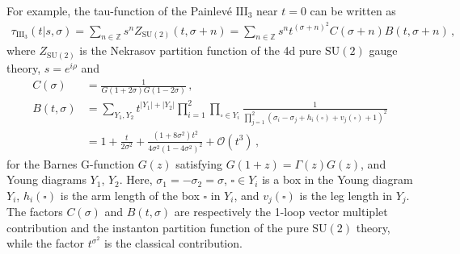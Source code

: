\documentclass[11pt, a4paper]{article}
\theoremstyle{definition}
\begin{document}
For example, the tau-function of the Painlev\'e $ \text{III}_{\text{3}} $ near $ t=0 $ can be written as
\begin{align}\label{eq:PIII-tau}
    \tau_{\text{III}_3}(t|s,\sigma) = \sum_{n\in \mathbb{Z}} s^n Z_{\mathrm{SU}(2)}(t, \sigma+n) = \sum_{n\in \mathbb{Z}} s^n t^{(\sigma+n)^2} C(\sigma+n) B(t, \sigma+n) \, ,
\end{align}
where $ Z_{\mathrm{SU}(2)} $ is the Nekrasov partition function of the 4d pure $ \mathrm{SU}(2) $ gauge theory, $ s=e^{i\rho} $ and
\begin{align}
    C(\sigma) &= \frac{1}{G(1+2\sigma) G(1-2\sigma)} \, , \\
    B(t, \sigma) &= \sum_{Y_1, Y_2} t^{|Y_1|+|Y_2|} \prod_{i=1}^2 \prod_{\square \in Y_i} \frac{1}{\prod_{j=1}^2 (\sigma_i-\sigma_j + h_i(\square) + v_j(\square)+1)^2} \\
    &= 1 + \frac{t}{2\sigma^2} + \frac{(1+8\sigma^2)t^2}{4\sigma^2(1-4\sigma^2)^2} + \mathcal{O}(t^3) \, , \nonumber
\end{align}
for the Barnes G-function $ G(z) $ satisfying $ G(1+z) = \Gamma(z) G(z) $, and Young diagrams $ Y_1 $, $ Y_2 $. Here, $ \sigma_1=-\sigma_2=\sigma $, $ \square\in Y_i $ is a box in the Young diagram $ Y_i $, $ h_i(\square) $ is the arm length of the box $ \square $ in $ Y_i $, and $ v_j(\square) $ is the leg length in $ Y_j $. The factors $ C(\sigma) $ and $ B(t,\sigma) $ are respectively the 1-loop vector multiplet contribution and the instanton partition function of the pure $ \mathrm{SU}(2) $ theory, while the factor $ t^{\sigma^2} $ is the classical contribution.
\end{document}
